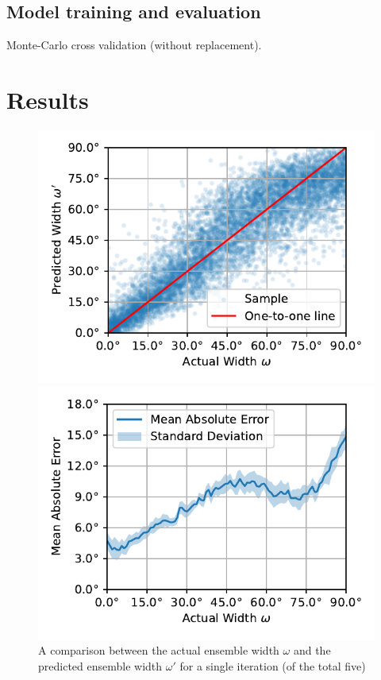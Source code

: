 \documentclass{article}
\begin{document}
\subsection{Model training and evaluation}
\label{subsec:training_evaluation}

Monte-Carlo cross validation (without replacement).

\section{Results}
\label{sec:results}

\begin{figure}[ht]
  \centering
  \begin{minipage}[t]{0.45\linewidth}
    \includegraphics[width=\linewidth]{../figures/actual_vs_predicted_width.pdf}
    \caption{\label{fig:actual_vs_predicted_width}A comparison between the actual ensemble width $\omega$ and the predicted ensemble width $\omega'$ for a single iteration (of the total five) }
  \end{minipage}
  \hspace{0.5cm}
  \begin{minipage}[t]{0.45\linewidth}
    \includegraphics[width=\linewidth]{../figures/mae_width.pdf}

\end{minipage}
\end{figure}
\end{document}
